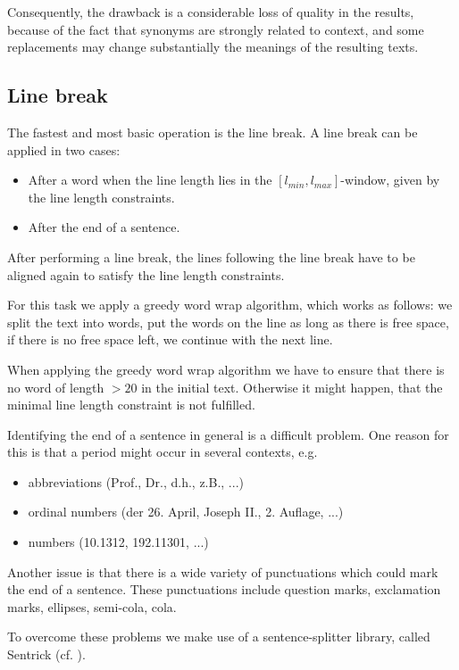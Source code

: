 \documentclass[11pt]{reportAlternative}
\begin{document}
Consequently, the drawback is a considerable loss of quality in the results, because of the fact that synonyms are strongly related to context, and some replacements may change substantially the meanings of the resulting texts.

\subsection{Line break}
The fastest and most basic operation is the line break. A line break can be applied in two cases:

\begin{itemize}
	\item After a word when the line length lies in the $[l_{min},l_{max}]$-window,
	given by the line length constraints.
	\item After the end of a sentence.
\end{itemize}
After performing a line break, the lines following the line break have
to be aligned again to satisfy the line length constraints.

For this task we apply a greedy word wrap algorithm, which works as follows: we split the text into words,
put the words on the line as long as there is free space, if there is no free space left, we continue with the next line.

When applying the greedy word wrap algorithm we have to ensure that
there is no word of length $> 20$ in the initial text. Otherwise it might happen, that the minimal line
length constraint is not fulfilled.

Identifying the end of a sentence in general is a difficult problem. One reason for this is that a period
might occur in several contexts, e.g.

\begin{itemize}

	\item abbreviations (Prof., Dr., d.h., z.B., ...)
	\item ordinal numbers (der 26. April, Joseph II., 2. Auflage, ...)
	\item numbers (10.1312, 192.11301, ...)

\end{itemize}

Another issue is that there is a wide variety of punctuations which could mark the end of a sentence. These punctuations include question marks, exclamation marks, ellipses, semi-cola, cola.

To overcome these problems we make use of a sentence-splitter library, called Sentrick (cf. \cite{Sentrick}).
\end{document}
